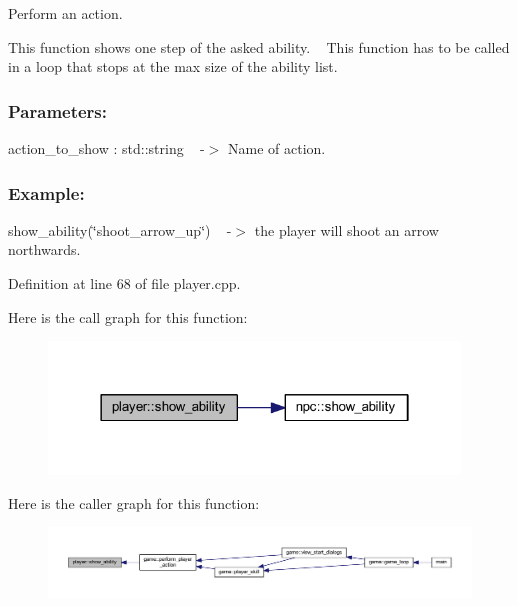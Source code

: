 Perform an action. 

This function shows one step of the asked ability. ~\newline
This function has to be called in a loop that stops at the max size of the ability list. ~\newline


\subsubsection*{Parameters\+: }

action\+\_\+to\+\_\+show \+: std\+::string ~\newline
-\/$>$ Name of action.

\subsubsection*{Example\+: }

show\+\_\+ability(\char`\"{}shoot\+\_\+arrow\+\_\+up\char`\"{}) ~\newline
-\/$>$ the player will shoot an arrow northwards. 

Definition at line 68 of file player.\+cpp.

Here is the call graph for this function\+:
\nopagebreak
\begin{figure}[H]
\begin{center}
\leavevmode
\includegraphics[width=310pt]{classplayer_a4659a0677d5b19b0ae27737dfaa0176e_cgraph}
\end{center}
\end{figure}
Here is the caller graph for this function\+:
\nopagebreak
\begin{figure}[H]
\begin{center}
\leavevmode
\includegraphics[width=350pt]{classplayer_a4659a0677d5b19b0ae27737dfaa0176e_icgraph}
\end{center}
\end{figure}



